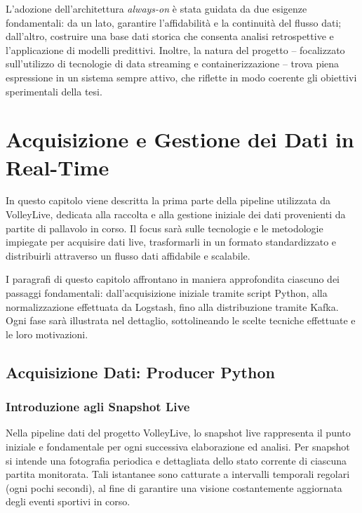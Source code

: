 \documentclass[a4paper,12pt]{report}
\begin{document}
L’adozione dell’architettura \textit{always-on} è stata guidata da due esigenze fondamentali: da un lato, garantire l’affidabilità e la continuità del flusso dati; dall’altro, costruire una base dati storica che consenta analisi retrospettive e l’applicazione di modelli predittivi. Inoltre, la natura del progetto – focalizzato sull’utilizzo di tecnologie di data streaming e containerizzazione – trova piena espressione in un sistema sempre attivo, che riflette in modo coerente gli obiettivi sperimentali della tesi.



\chapter{Acquisizione e Gestione dei Dati in Real-Time}

In questo capitolo viene descritta la prima parte della pipeline utilizzata da VolleyLive, dedicata alla raccolta e alla gestione iniziale dei dati provenienti da partite di pallavolo in corso. Il focus sarà sulle tecnologie e le metodologie impiegate per acquisire dati live, trasformarli in un formato standardizzato e distribuirli attraverso un flusso dati affidabile e scalabile.

I paragrafi di questo capitolo affrontano in maniera approfondita ciascuno dei passaggi fondamentali: dall'acquisizione iniziale tramite script Python, alla normalizzazione effettuata da Logstash, fino alla distribuzione tramite Kafka. Ogni fase sarà illustrata nel dettaglio, sottolineando le scelte tecniche effettuate e le loro motivazioni.

\section{Acquisizione Dati: Producer Python}

\subsection{Introduzione agli Snapshot Live}

Nella pipeline dati del progetto VolleyLive, lo snapshot live rappresenta il punto iniziale e fondamentale per ogni successiva elaborazione ed analisi. Per snapshot si intende una fotografia periodica e dettagliata dello stato corrente di ciascuna partita monitorata. Tali istantanee sono catturate a intervalli temporali regolari (ogni pochi secondi), al fine di garantire una visione costantemente aggiornata degli eventi sportivi in corso.
\end{document}
